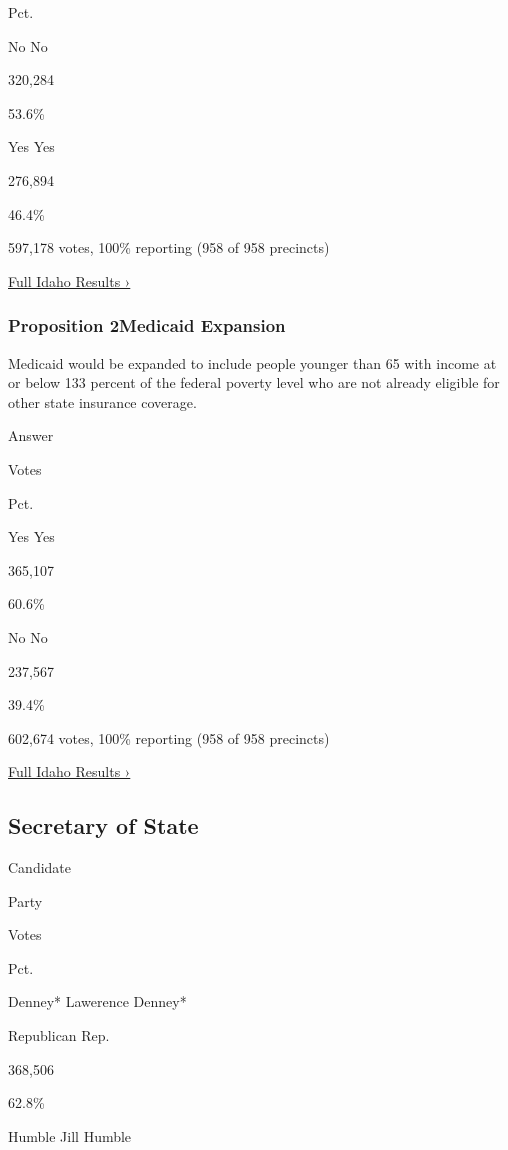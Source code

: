 Pct.

 No No

320,284

53.6\%

 Yes Yes

276,894

46.4\%

597,178 votes, 100\% reporting (958 of 958 precincts)

\href{https://www.nytimes3xbfgragh.onion/interactive/2018/11/06/us/elections/results-idaho-elections.html}{Full
Idaho Results ›}

\hypertarget{proposition-2medicaid-expansion}{%
\subsubsection{Proposition 2Medicaid
Expansion}\label{proposition-2medicaid-expansion}}

Medicaid would be expanded to include people younger than 65 with income
at or below 133 percent of the federal poverty level who are not already
eligible for other state insurance coverage.

Answer

Votes

Pct.

 Yes Yes

365,107

60.6\%

 No No

237,567

39.4\%

602,674 votes, 100\% reporting (958 of 958 precincts)

\href{https://www.nytimes3xbfgragh.onion/interactive/2018/11/06/us/elections/results-idaho-elections.html}{Full
Idaho Results ›}

\hypertarget{secretary-of-state}{%
\subsection{Secretary of State}\label{secretary-of-state}}

Candidate

Party

Votes

Pct.

 Denney* Lawerence Denney*

Republican Rep.

368,506

62.8\%

 Humble Jill Humble

